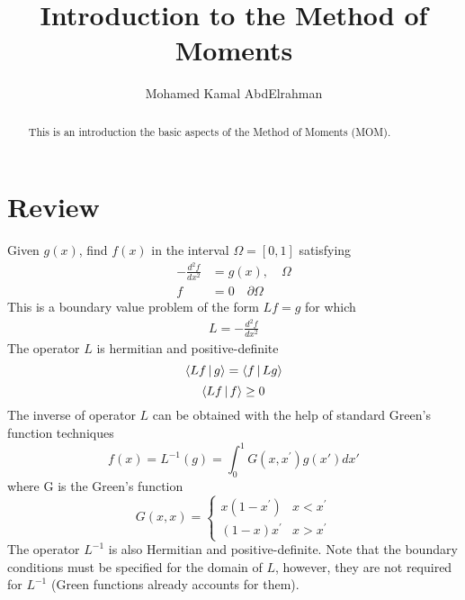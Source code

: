 \documentclass{tufte-handout}
\title{Introduction to the Method of Moments}
\author[MK]{Mohamed Kamal AbdElrahman}
\begin{document}
\maketitle%

\begin{abstract}
This is an introduction the basic aspects of the Method of Moments (MOM).  
\end{abstract}
\section{Review}
Given $g(x)$, find $f(x)$ in the interval $ \Omega = [0,1]$ satisfying 
\begin{equation}
  \begin{aligned}
  -\frac{d^2 f}{d x^2} &=g(x),\quad \Omega\\
  f&=0  \quad \partial\Omega
  \end{aligned} 
\end{equation}
This is a boundary value problem of the form $L f = g$ for which 
\begin{align}
L =  -\frac{d^2 f}{d x^2}
\end{align}  
The operator $L$ is hermitian and positive-definite
\begin{equation}
\Braket{L f|g} = \Braket{f|L g}
\end{equation}  
 \begin{equation}
 \Braket{L f|f} \geq 0
 \end{equation}
 The inverse of operator $L$ can be obtained  with the help of standard Green's function techniques 
 \begin{equation}
 f(x) = L^{-1}(g) = \int_{0}^{1} G(x,x^{\prime})  g(x') dx'
 \end{equation}
 where G is the Green's function
 \begin{equation}
 G(x,x) = \begin{cases} 
 x(1-x^\prime) & x < x^\prime \\
 (1-x)x^\prime & x > x^\prime 
 \end{cases}
 \end{equation}
 The operator $L^{-1}$ is also Hermitian and positive-definite. Note that the boundary conditions must be specified for the domain of $L$, however, they are not required for $L^{-1}$ (Green functions already accounts for them).  
\end{document}
